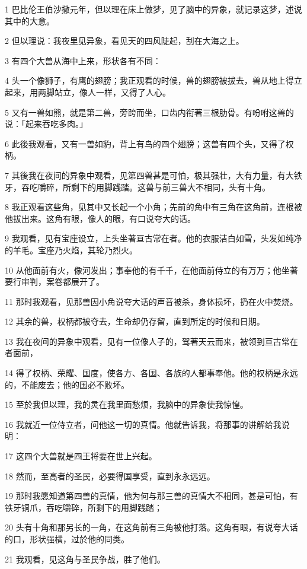 \par 1 巴比伦王伯沙撒元年，但以理在床上做梦，见了脑中的异象，就记录这梦，述说其中的大意。
\par 2 但以理说：我夜里见异象，看见天的四风陡起，刮在大海之上。
\par 3 有四个大兽从海中上来，形状各有不同：
\par 4 头一个像狮子，有鹰的翅膀；我正观看的时候，兽的翅膀被拔去，兽从地上得立起来，用两脚站立，像人一样，又得了人心。
\par 5 又有一兽如熊，就是第二兽，旁跨而坐，口齿内衔著三根肋骨。有吩咐这兽的说：「起来吞吃多肉。」
\par 6 此後我观看，又有一兽如豹，背上有鸟的四个翅膀；这兽有四个头，又得了权柄。
\par 7 其後我在夜间的异象中观看，见第四兽甚是可怕，极其强壮，大有力量，有大铁牙，吞吃嚼碎，所剩下的用脚践踏。这兽与前三兽大不相同，头有十角。
\par 8 我正观看这些角，见其中又长起一个小角；先前的角中有三角在这角前，连根被他拔出来。这角有眼，像人的眼，有口说夸大的话。
\par 9 我观看，见有宝座设立，上头坐著亘古常在者。他的衣服洁白如雪，头发如纯净的羊毛。宝座乃火焰，其轮乃烈火。
\par 10 从他面前有火，像河发出；事奉他的有千千，在他面前侍立的有万万；他坐著要行审判，案卷都展开了。
\par 11 那时我观看，见那兽因小角说夸大话的声音被杀，身体损坏，扔在火中焚烧。
\par 12 其余的兽，权柄都被夺去，生命却仍存留，直到所定的时候和日期。
\par 13 我在夜间的异象中观看，见有一位像人子的，驾著天云而来，被领到亘古常在者面前，
\par 14 得了权柄、荣耀、国度，使各方、各国、各族的人都事奉他。他的权柄是永远的，不能废去；他的国必不败坏。
\par 15 至於我但以理，我的灵在我里面愁烦，我脑中的异象使我惊惶。
\par 16 我就近一位侍立者，问他这一切的真情。他就告诉我，将那事的讲解给我说明：
\par 17 这四个大兽就是四王将要在世上兴起。
\par 18 然而，至高者的圣民，必要得国享受，直到永永远远。
\par 19 那时我愿知道第四兽的真情，他为何与那三兽的真情大不相同，甚是可怕，有铁牙铜爪，吞吃嚼碎，所剩下的用脚践踏；
\par 20 头有十角和那另长的一角，在这角前有三角被他打落。这角有眼，有说夸大话的口，形状强横，过於他的同类。
\par 21 我观看，见这角与圣民争战，胜了他们。
